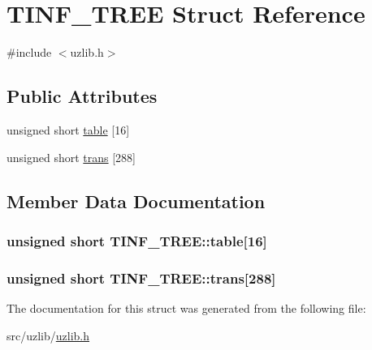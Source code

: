 \hypertarget{structTINF__TREE}{}\section{T\+I\+N\+F\+\_\+\+T\+R\+EE Struct Reference}
\label{structTINF__TREE}


{\ttfamily \#include $<$uzlib.\+h$>$}

\subsection*{Public Attributes}
\begin{DoxyCompactItemize}
\item 
unsigned short \hyperlink{structTINF__TREE_ab33de7499e0450dfc9d7b59695519577}{table} \mbox{[}16\mbox{]}
\item 
unsigned short \hyperlink{structTINF__TREE_ae911de8d690b0fa7cab647891c5db16c}{trans} \mbox{[}288\mbox{]}
\end{DoxyCompactItemize}


\subsection{Member Data Documentation}
\subsubsection[{\texorpdfstring{table}{table}}]{\setlength{\rightskip}{0pt plus 5cm}unsigned short T\+I\+N\+F\+\_\+\+T\+R\+E\+E\+::table\mbox{[}16\mbox{]}}\hypertarget{structTINF__TREE_ab33de7499e0450dfc9d7b59695519577}{}\label{structTINF__TREE_ab33de7499e0450dfc9d7b59695519577}
\subsubsection[{\texorpdfstring{trans}{trans}}]{\setlength{\rightskip}{0pt plus 5cm}unsigned short T\+I\+N\+F\+\_\+\+T\+R\+E\+E\+::trans\mbox{[}288\mbox{]}}\hypertarget{structTINF__TREE_ae911de8d690b0fa7cab647891c5db16c}{}\label{structTINF__TREE_ae911de8d690b0fa7cab647891c5db16c}


The documentation for this struct was generated from the following file\+:\begin{DoxyCompactItemize}
\item 
src/uzlib/\hyperlink{uzlib_8h}{uzlib.\+h}\end{DoxyCompactItemize}
